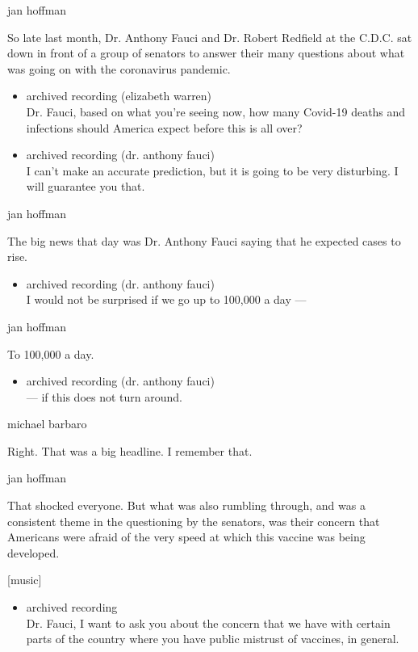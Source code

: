 jan hoffman

So late last month, Dr. Anthony Fauci and Dr. Robert Redfield at the
C.D.C. sat down in front of a group of senators to answer their many
questions about what was going on with the coronavirus pandemic.

\begin{itemize}
\item
  archived recording (elizabeth warren)\\
  Dr. Fauci, based on what you're seeing now, how many Covid-19 deaths
  and infections should America expect before this is all over?
\item
  archived recording (dr. anthony fauci)\\
  I can't make an accurate prediction, but it is going to be very
  disturbing. I will guarantee you that.
\end{itemize}

jan hoffman

The big news that day was Dr. Anthony Fauci saying that he expected
cases to rise.

\begin{itemize}
\tightlist
\item
  archived recording (dr. anthony fauci)\\
  I would not be surprised if we go up to 100,000 a day ---
\end{itemize}

jan hoffman

To 100,000 a day.

\begin{itemize}
\tightlist
\item
  archived recording (dr. anthony fauci)\\
  --- if this does not turn around.
\end{itemize}

michael barbaro

Right. That was a big headline. I remember that.

jan hoffman

That shocked everyone. But what was also rumbling through, and was a
consistent theme in the questioning by the senators, was their concern
that Americans were afraid of the very speed at which this vaccine was
being developed.

{[}music{]}

\begin{itemize}
\tightlist
\item
  archived recording\\
  Dr. Fauci, I want to ask you about the concern that we have with
  certain parts of the country where you have public mistrust of
  vaccines, in general.
\end{itemize}

